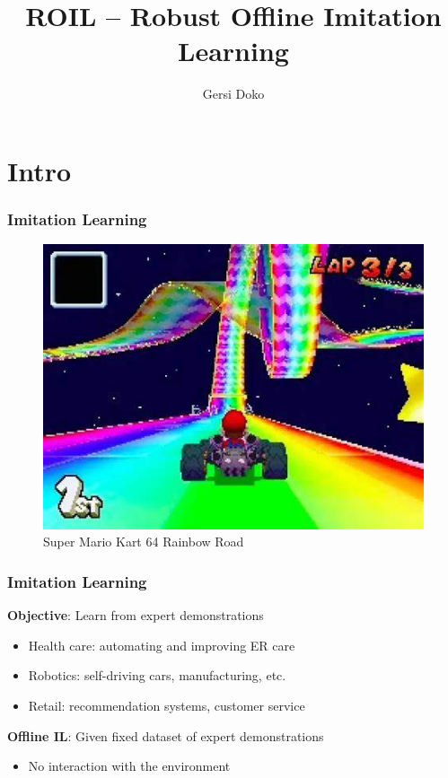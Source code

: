 \documentclass{beamer}
\title{ROIL -- Robust Offline Imitation Learning}
\author{Gersi Doko}
\institute{Department of Computer Science \\ University of New Hampshire}
\date{}
\begin{document}
\frame{\titlepage}

\section*{Intro}

\begin{frame}
	\frametitle{Imitation Learning}
	\centering
	\begin{minipage}{0.9\linewidth}
		\begin{figure}
			\centering
			\includegraphics[width=\linewidth]{plots/rainbow_road.jpeg}
			\caption{Super Mario Kart 64 Rainbow Road}
		\end{figure}
	\end{minipage}
\end{frame}

\begin{frame}
	\frametitle{Imitation Learning}
	\textbf{Objective}: Learn from expert demonstrations
	\begin{itemize}
		\item Health care: automating and improving ER care
		\item Robotics: self-driving cars, manufacturing, etc.
		\item Retail: recommendation systems, customer service
	\end{itemize}
	\vfill
	\textbf{Offline IL}: Given fixed dataset of expert demonstrations
	\begin{itemize}
		\item No interaction with the environment
	\end{itemize}
\end{frame}
\end{document}
